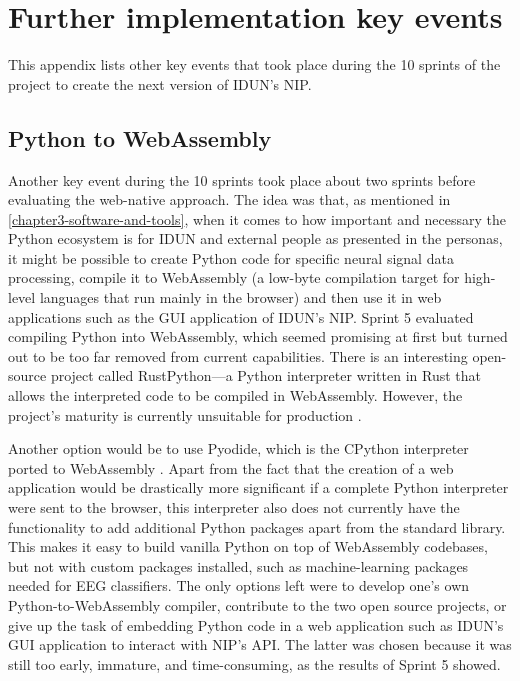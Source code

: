 \chapter{Further implementation key events}
\label{appendix4-further-implementation-key-events}
\graphicspath{{Appendix4/Figs/}{Appendix4/Figs/}}

This appendix lists other key events that took place during the 10 sprints of the project to create the next version of IDUN's NIP.

\section*{Python to WebAssembly}
\label{chapter4-python-to-webassembly}

Another key event during the 10 sprints took place about two sprints before evaluating the web-native approach. The idea was that, as mentioned in \autoref{chapter3-software-and-tools}, when it comes to how important and necessary the Python ecosystem is for IDUN and external people as presented in the personas, it might be possible to create Python code for specific neural signal data processing, compile it to WebAssembly (a low-byte compilation target for high-level languages that run mainly in the browser)  and then use it in web applications such as the GUI application of IDUN's NIP. Sprint 5 evaluated compiling Python into WebAssembly, which seemed promising at first but turned out to be too far removed from current capabilities. There is an interesting open-source project called RustPython—a Python interpreter written in Rust that allows the interpreted code to be compiled in WebAssembly. However, the project’s maturity is currently unsuitable for production \citep{noauthor_rustpython_2022}.

Another option would be to use Pyodide, which is the CPython interpreter ported to WebAssembly  \citep{noauthor_pyodide_2022}. Apart from the fact that the creation of a web application would be drastically more significant if a complete Python interpreter were sent to the browser, this interpreter also does not currently have the functionality to add additional Python packages apart from the standard library. This makes it easy to build vanilla Python on top of WebAssembly codebases, but not with custom packages installed, such as machine-learning packages needed for EEG classifiers. The only options left were to develop one’s own Python-to-WebAssembly compiler, contribute to the two open source projects, or give up the task of embedding Python code in a web application such as IDUN’s GUI application to interact with NIP’s API. The latter was chosen because it was still too early, immature, and time-consuming, as the results of Sprint 5 showed.

